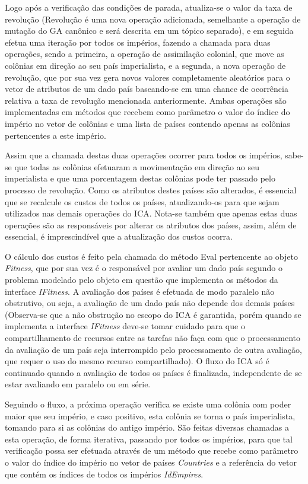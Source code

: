 Logo após a verificação das condições de parada, atualiza-se o valor da taxa de revolução (Revolução é uma nova operação adicionada, semelhante a operação de mutação do GA canônico e será descrita em um tópico separado), e em seguida efetua uma iteração por todos os impérios, fazendo a chamada para duas operações, sendo a primeira, a operação de assimilação colonial, que move as colônias em direção ao seu país imperialista, e a segunda, a nova operação de revolução, que por sua vez gera novos valores completamente aleatórios para o vetor de atributos de um dado país baseando-se em uma chance de ocorrência relativa a taxa de revolução mencionada anteriormente. Ambas operações são implementadas em métodos que recebem como parâmetro o valor do índice do império no vetor de colônias e uma lista de países contendo apenas as colônias pertencentes a este império.

Assim que a chamada destas duas operações ocorrer para todos os impérios, sabe-se que todas as colônias efetuaram a movimentação em direção ao seu imperialista e que uma porcentagem destas colônias pode ter passado pelo processo de revolução. Como os atributos destes países são alterados, é essencial que se recalcule os custos de todos os países, atualizando-os para que sejam utilizados nas demais operações do ICA. Nota-se também que apenas estas duas operações são as responsáveis por alterar os atributos dos países, assim, além de essencial, é imprescindível que a atualização dos custos ocorra.

O cálculo dos custos é feito pela chamada do método Eval pertencente ao objeto \emph{Fitness}, que por sua vez é o responsável por avaliar um dado país segundo o problema modelado pelo objeto em questão que implementa os métodos da interface \emph{IFitness}. A avaliação dos países é efetuada de modo paralelo não obstrutivo, ou seja, a avaliação de um dado país não depende dos demais países (Observa-se que a não obstrução no escopo do ICA é garantida, porém quando se implementa a interface \emph{IFitness} deve-se tomar cuidado para que o compartilhamento de recursos entre as tarefas não faça com que o processamento da avaliação de um país seja interrompido pelo processamento de outra avaliação, que requer o uso do mesmo recurso compartilhado). O fluxo do ICA só é continuado quando a avaliação de todos os países é finalizada, independente de se estar avaliando em paralelo ou em série.

Seguindo o fluxo, a próxima operação verifica se existe uma colônia com poder maior que seu império, e caso positivo, esta colônia se torna o país imperialista, tomando para si as colônias do antigo império. São feitas diversas chamadas a esta operação, de forma iterativa, passando por todos os impérios, para que tal verificação possa ser efetuada através de um método que recebe como parâmetro o valor do índice do império no vetor de países \emph{Countries} e a referência do vetor que contém os índices de todos os impérios \emph{IdEmpires}.  


